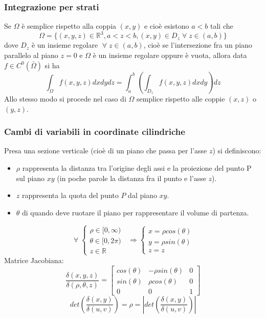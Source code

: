\subsubsection{Integrazione per strati}
Se $\Omega$ è semplice rispetto alla coppia $(x,y)$ e cioè esistono $a<b$ tali che
\[
    \Omega = \{(x,y,z) \in \mathbb{R}^3, a<z<b, (x,y) \in D_z \;\forall\;z \in(a,b)\}
\]
dove $D_z$ è un insieme regolare $\;\forall\;z \in(a,b)$, cioè se l'intersezione fra un piano parallelo al piano $z=0$ e $\Omega$ è un insieme regolare oppure è vuota, allora data $f \in C^0(\bar{\Omega})$ si ha 
\[
    \int_\Omega f(x,y,z) dxdydz = \int_{a}^{b}\left(\int_{D_z}f(x,y,z)dxdy\right)dz
\]
Allo stesso modo si procede nel caso di $\Omega$ semplice rispetto alle coppie $(x,z)$ o $(y,z)$.
\subsubsection{Cambi di variabili in coordinate cilindriche}
Presa una sezione verticale (cioè di un piano che passa per l'asse $z$) si definiscono:
\begin{itemize}
    \item $\rho$ rappresenta la distanza tra l'origine degli assi e la proiezione del punto P sul piano $xy$ (in poche parole la distanza fra il punto e l'asse $z$).
    \item $z$ rappresenta la quota del punto $P$ dal piano $xy$.
    \item $\theta$ di quando deve ruotare il piano per rappresentare il volume di partenza.
\end{itemize}
\[
    \;\forall\; \begin{cases}
        \rho \in [0,\infty)\\
        \theta \in [0,2\pi)\\
        z \in \mathbb{R}
    \end{cases} \;\; \Longrightarrow \begin{cases}
        x = \rho cos(\theta)\\
        y = \rho sin(\theta)\\
        z = z
    \end{cases}
\]
Matrice Jacobiana:
\[
    \frac{\delta(x,y,z)}{\delta(\rho,\theta,z)} = \left[
    \begin{matrix}
        cos(\theta) & -\rho sin(\theta) & 0\\ 
        sin(\theta) & \rho cos(\theta) & 0 \\ 
        0 & 0 & 1
    \end{matrix}\right]
\]
\[
    det\left(\frac{\delta(x,y)}{\delta(u,v)}\right) = \rho = \left|det\left(\frac{\delta(x,y)}{\delta(u,v)}\right)\right|
\]
